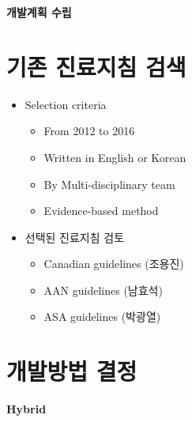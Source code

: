 \documentclass{paper}
\begin{document}
\Large \textbf{개발계획 수립} \normalsize

\section{기존 진료지침 검색}
	\begin{itemize}
		\item Selection criteria
			\begin{itemize}
				\item From 2012 to 2016
				\item Written in English or Korean
				\item By Multi-disciplinary team
				\item Evidence-based method
			\end{itemize}
		\item 선택된 진료지침 검토
		\begin{itemize}
			\item Canadian guidelines (조용진)
			\item AAN guidelines (남효석)
			\item ASA guidelines (박광열)
		\end{itemize}
	\end{itemize}
	
\section{개발방법 결정}

\textbf{Hybrid}

\end{document}
